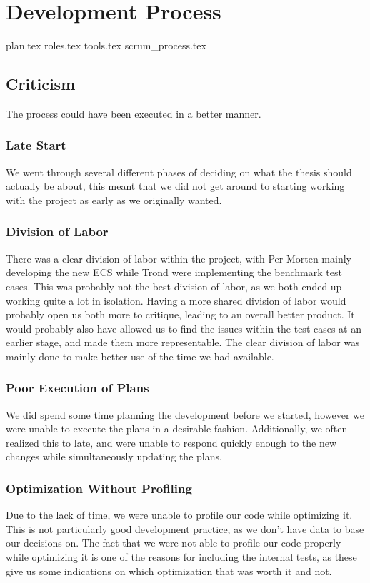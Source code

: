 \chapter{Development Process}
\label{chap:process}

{plan.tex}
{roles.tex}
{tools.tex}
{scrum_process.tex}

\section{Criticism}
The process could have been executed in a better manner.

\subsection{Late Start}
We went through several different phases of deciding on what the thesis should actually be about,
this meant that we did not get around to starting working with the project as early as we originally
wanted.

\subsection{Division of Labor}
There was a clear division of labor within the project, with Per-Morten mainly developing
the new ECS while Trond were implementing the benchmark test cases.
This was probably not the best division of labor,
as we both ended up working quite a lot in isolation.
Having a more shared division of labor would probably open us both more to critique,
leading to an overall better product.
It would probably also have allowed us to find the issues within the test cases at an earlier stage,
and made them more representable.
The clear division of labor was mainly done to make better use of the time we had available.

\subsection{Poor Execution of Plans}
We did spend some time planning the development before we started, however we were unable
to execute the plans in a desirable fashion. Additionally, we often realized this to late,
and were unable to respond quickly enough to the new changes while simultaneously updating the plans.

\subsection{Optimization Without Profiling}
Due to the lack of time, we were unable to profile our code while optimizing it.
This is not particularly good development practice, as we don't have data to base
our decisions on.
The fact that we were not able to profile our code properly while optimizing it
is one of the reasons for including the internal tests, as these give us some
indications on which optimization that was worth it and not.
